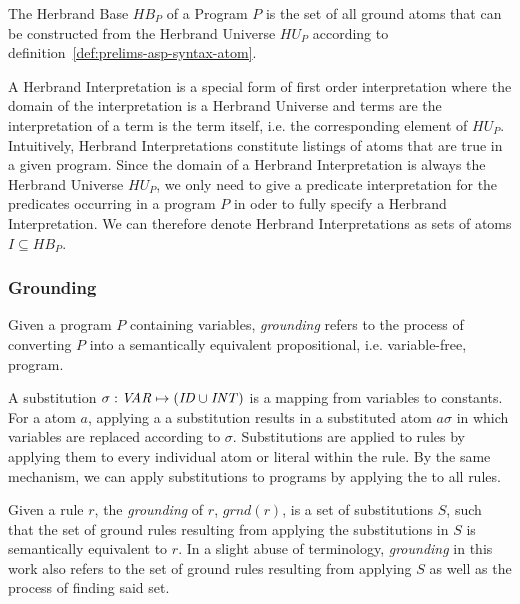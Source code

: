 \begin{definition}
\label{def:prelims-asp-semantics-hb}
The Herbrand Base $HB_P$ of a Program $P$ is the set of all ground atoms that can be constructed from the Herbrand Universe $HU_P$ according to definition~\ref{def:prelims-asp-syntax-atom}. 
\end{definition}

\begin{definition}
\label{def:prelims-asp-semantics-herbrand-interpretation}
A Herbrand Interpretation is a special form of first order interpretation where the domain of the interpretation is a Herbrand Universe and terms are the interpretation of a term is the term itself, i.e. the corresponding element of $HU_P$. Intuitively, Herbrand Interpretations constitute listings of atoms that are true in a given program. Since the domain of a Herbrand Interpretation is always the Herbrand Universe $HU_P$, we only need to give a predicate interpretation for the predicates occurring in a program $P$ in oder to fully specify a Herbrand Interpretation. We can therefore denote Herbrand Interpretations as sets of atoms $I \subseteq HB_P$.
\end{definition}

\subsubsection{Grounding}
\label{subsubsec:prelims-grounding}
Given a program $P$ containing variables, \emph{grounding} refers to the process of converting $P$ into a semantically equivalent propositional, i.e. variable-free, program.

\begin{definition}
\label{def:prelims-asp-semantics-substitution}
A substitution $\sigma: \mathit{VAR} \mapsto (\mathit{ID} \cup \mathit{INT})$ is a mapping from variables to constants. For a atom $a$, applying a a substitution results in a substituted atom $a\sigma$ in which variables are replaced according to $\sigma$. Substitutions are applied to rules  by applying them to every individual atom or literal within the rule. By the same mechanism, we can apply substitutions to programs by applying the to all rules.
\end{definition}

\begin{definition}[Grounding]
\label{def:prelims-asp-semantics-grounding}
Given a rule $r$, the \emph{grounding} of $r$, $\mathit{grnd}(r)$, is a set of substitutions $S$, such that the set of ground rules resulting from applying the substitutions in $S$ is semantically equivalent to $r$. In a slight abuse of terminology, \emph{grounding} in this work also refers to the set of ground rules resulting from applying $S$ as well as the process of finding said set.
\end{definition}

